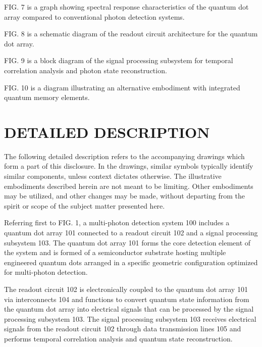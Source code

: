\documentclass[12pt,letterpaper]{article}
\begin{document}
FIG. 7 is a graph showing spectral response characteristics of the quantum dot array compared to conventional photon detection systems.

FIG. 8 is a schematic diagram of the readout circuit architecture for the quantum dot array.

FIG. 9 is a block diagram of the signal processing subsystem for temporal correlation analysis and photon state reconstruction.

FIG. 10 is a diagram illustrating an alternative embodiment with integrated quantum memory elements.

\section*{DETAILED DESCRIPTION}


The following detailed description refers to the accompanying drawings which form a part of this disclosure. In the drawings, similar symbols typically identify similar components, unless context dictates otherwise. The illustrative embodiments described herein are not meant to be limiting. Other embodiments may be utilized, and other changes may be made, without departing from the spirit or scope of the subject matter presented here.

Referring first to FIG. 1, a multi-photon detection system 100 includes a quantum dot array 101 connected to a readout circuit 102 and a signal processing subsystem 103. The quantum dot array 101 forms the core detection element of the system and is formed of a semiconductor substrate hosting multiple engineered quantum dots arranged in a specific geometric configuration optimized for multi-photon detection.

The readout circuit 102 is electronically coupled to the quantum dot array 101 via interconnects 104 and functions to convert quantum state information from the quantum dot array into electrical signals that can be processed by the signal processing subsystem 103. The signal processing subsystem 103 receives electrical signals from the readout circuit 102 through data transmission lines 105 and performs temporal correlation analysis and quantum state reconstruction.
\end{document}
